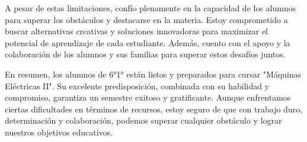 \documentclass[planificacion2024.tex]{subfiles}
\begin{document}
A pesar de estas limitaciones, confío plenamente en la capacidad de los alumnos para superar los obstáculos y destacarse en la materia. Estoy comprometido a buscar alternativas creativas y soluciones innovadoras para maximizar el potencial de aprendizaje de cada estudiante. Además, cuento con el apoyo y la colaboración de los alumnos y sus familias para superar estos desafíos juntos.

En resumen, los alumnos de 6°1° están listos y preparados para cursar "Máquinas Eléctricas II". Su excelente predisposición, combinada con su habilidad y compromiso, garantiza un semestre exitoso y gratificante. Aunque enfrentamos ciertas dificultades en términos de recursos, estoy seguro de que con trabajo duro, determinación y colaboración, podemos superar cualquier obstáculo y lograr nuestros objetivos educativos.
\end{document}
